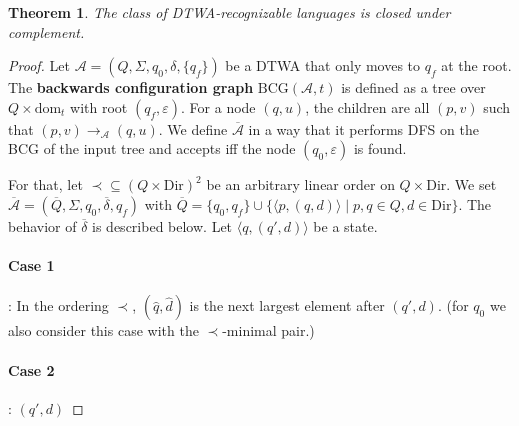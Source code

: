 \documentclass{article}
\newtheorem{theorem}{Theorem}
\begin{document}
\vspace{1cm}
\begin{theorem}
\label{dtwa_complement}
	The class of DTWA-recognizable languages is closed under complement.
\end{theorem}
\begin{proof}
	Let $\mathcal{A} = (Q, \Sigma, q_0, \delta, \{q_f\})$ be a DTWA that only moves to $q_f$ at the root. The \textbf{backwards configuration graph} $\text{BCG}(\mathcal{A}, t)$ is defined as a tree over $Q \times \text{dom}_t$ with root $(q_f, \varepsilon)$. For a node $(q, u)$, the children are all $(p, v)$ such that $(p, v) \rightarrow_\mathcal{A} (q, u)$. We define $\overline{\mathcal{A}}$ in a way that it performs DFS on the BCG of the input tree and accepts iff the node $(q_0, \varepsilon)$ is found.
	
	For that, let $\prec \subseteq (Q \times \text{Dir})^2$ be an arbitrary linear order on $Q \times \text{Dir}$. We set $\overline{\mathcal{A}} = (\overline{Q}, \Sigma, q_0, \overline{\delta}, q_f)$ with $\overline{Q} = \{q_0, q_f\} \cup \{ \langle p, (q, d) \rangle \mid p, q \in Q, d \in \text{Dir} \}$. The behavior of $\overline{\delta}$ is described below. Let $\langle q, (q', d) \rangle$ be a state.
	
	\paragraph{Case 1}: In the ordering $\prec$, $(\hat{q}, \hat{d})$ is the next largest element after $(q', d)$. (for $q_0$ we also consider this case with the $\prec$-minimal pair.)
	
	
	\paragraph{Case 2}: $(q', d)$ %
\end{proof}
\end{document}
